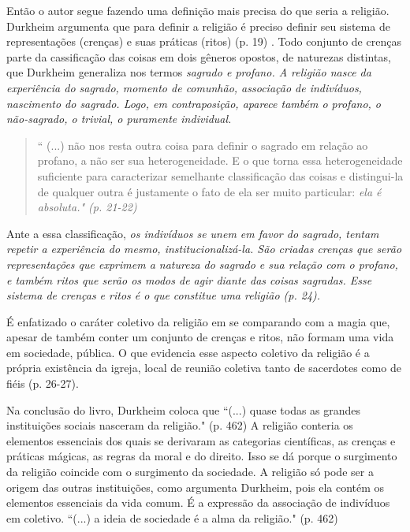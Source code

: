 \documentclass[12pt,a4paper]{article}
\begin{document}
Então o autor segue fazendo uma definição mais precisa do que seria a religião. Durkheim argumenta que para definir a religião é preciso definir seu sistema de representações (crenças) e suas práticas (ritos) (p. 19) . Todo conjunto de crenças parte da cassificação das coisas em dois gêneros opostos, de naturezas distintas, que Durkheim generaliza nos termos \em sagrado \em e \em profano\em . A religião nasce da experiência do sagrado, momento de comunhão, associação de indivíduos, nascimento do sagrado. Logo, em contraposição, aparece também o profano, o não-sagrado, o trivial, o puramente individual.
\begin{quote}
    `` (...) não nos resta outra coisa para definir o sagrado em relação ao profano, a não ser sua heterogeneidade. E o que torna essa heterogeneidade suficiente para caracterizar semelhante classificação das coisas e distingui-la de qualquer outra é justamente o fato de ela ser muito particular: \em ela é absoluta\em ." (p. 21-22)
\end{quote}
Ante a essa classificação, \em os indivíduos se unem em favor do sagrado\em , tentam repetir a experiência do mesmo, institucionalizá-la. São criadas crenças que serão representações que exprimem a natureza do sagrado e sua relação com o profano, e também ritos que serão os modos de agir diante das coisas sagradas. Esse sistema de crenças e ritos é o que constitue uma religião (p. 24).

É enfatizado o caráter coletivo da religião em se comparando com a magia que, apesar de também conter um conjunto de crenças e ritos, não formam uma vida em sociedade, pública. O que evidencia esse aspecto coletivo da religião é a própria existência da igreja, local de reunião coletiva tanto de sacerdotes como de fiéis (p. 26-27).


Na conclusão do livro, Durkheim coloca que ``(...) quase todas as grandes instituições sociais nasceram da religião."
(p. 462)
A religião conteria os elementos essenciais dos quais se derivaram as categorias científicas, as crenças e práticas mágicas, as regras da moral e do direito. Isso se dá porque o surgimento da religião coincide com o surgimento da sociedade. A religião só pode ser a origem das outras instituições, como argumenta Durkheim, pois ela contém os elementos essenciais da vida comum. É a expressão da associação de indivíduos em coletivo. ``(...) a ideia de sociedade é a alma da religião." (p. 462)
\end{document}
